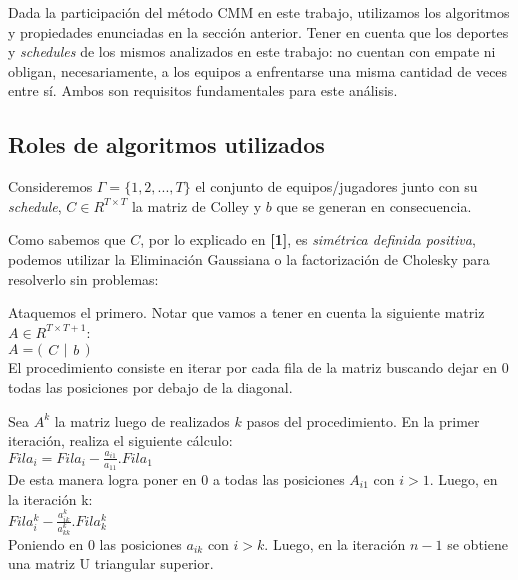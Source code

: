 Dada la participaci\'on del m\'etodo CMM en este trabajo, utilizamos los algoritmos y propiedades enunciadas en la secci\'on anterior. Tener en cuenta que los deportes y \textit{schedules} de los mismos analizados en este trabajo: no cuentan con empate ni obligan, necesariamente, a los equipos a enfrentarse una misma cantidad de veces entre s\'i. Ambos son requisitos fundamentales para este an\'alisis.

\subsection{Roles de algoritmos utilizados}

Consideremos $\Gamma = \{1,2,...,T\}$ el conjunto de equipos/jugadores junto con su \textit{schedule}, $C \in R^{T \times T}$ la matriz de Colley y $b$ que se generan en consecuencia.

Como sabemos que $C$, por lo explicado en \textbf{[1]}, es \textit{sim\'etrica definida positiva}, podemos utilizar la Eliminaci\'on Gaussiana o la factorizaci\'on de Cholesky para resolverlo sin problemas:

Ataquemos el primero. Notar que vamos a tener en cuenta la siguiente matriz $A \in R^{T \times T+1}$: \\

$A = \Big(
\begin{matrix}
C
\end{matrix}
\vert
\begin{matrix}
b
\end{matrix}
\Big)$ \\

El procedimiento consiste en iterar por cada fila de la matriz buscando dejar en 0 todas las posiciones por debajo de la diagonal.

Sea $A^{k}$ la matriz luego de realizados $k$ pasos del procedimiento. En la primer iteraci\'on, realiza el siguiente c\'alculo: \\

$Fila_{i} = Fila_{i} - \frac{a_{i1}}{a_{11}} . Fila_{1}$ \\

De esta manera logra poner en $0$ a todas las posiciones $A_{i1}$ con $i > 1$. Luego, en la iteraci\'on k: \\

$Fila_{i}^{k} - \frac{a_{ik}^{k}}{a_{kk}^{k}} . Fila_{k}^{k}$ \\

Poniendo en $0$ las posiciones $a_{ik}$ con $i > k$. Luego, en la iteraci\'on $n-1$ se obtiene una matriz U triangular superior.

